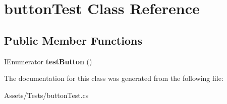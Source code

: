 \hypertarget{classbutton_test}{}\section{button\+Test Class Reference}
\label{classbutton_test}
\subsection*{Public Member Functions}
\begin{DoxyCompactItemize}
\item 
\mbox{\label{classbutton_test_a409de349282683bb6cbd771b67556faa}} 
I\+Enumerator {\bfseries test\+Button} ()
\end{DoxyCompactItemize}


The documentation for this class was generated from the following file\+:\begin{DoxyCompactItemize}
\item 
Assets/\+Tests/button\+Test.\+cs\end{DoxyCompactItemize}
